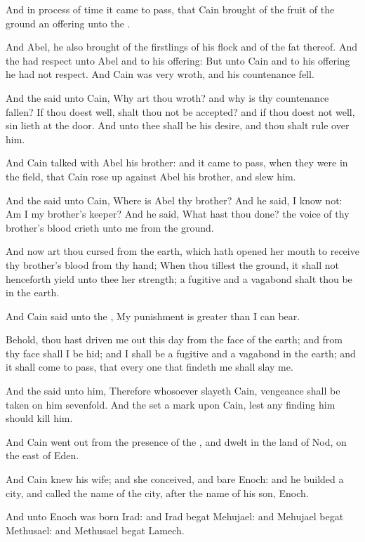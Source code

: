 \Verse And in process of time it came to pass, that Cain brought of the fruit of the ground an offering unto the \LORD.

\Verse And Abel, he also brought of the firstlings of his flock and of the fat thereof. And the \LORD had respect unto Abel and to his offering: \Verse But unto Cain and to his offering he had not respect.  And Cain was very wroth, and his countenance fell.

\Verse And the \LORD said unto Cain, Why art thou wroth? and why is thy countenance fallen?  \Verse If thou doest well, shalt thou not be accepted? and if thou doest not well, sin lieth at the door. And unto thee shall be his desire, and thou shalt rule over him.

\Verse And Cain talked with Abel his brother: and it came to pass, when they were in the field, that Cain rose up against Abel his brother, and slew him.

\Verse And the \LORD said unto Cain, Where is Abel thy brother? And he said, I know not: Am I my brother's keeper?  \Verse And he said, What hast thou done? the voice of thy brother's blood crieth unto me from the ground.

\Verse And now art thou cursed from the earth, which hath opened her mouth to receive thy brother's blood from thy hand; \Verse When thou tillest the ground, it shall not henceforth yield unto thee her strength; a fugitive and a vagabond shalt thou be in the earth.

\Verse And Cain said unto the \LORD, My punishment is greater than I can bear.

\Verse Behold, thou hast driven me out this day from the face of the earth; and from thy face shall I be hid; and I shall be a fugitive and a vagabond in the earth; and it shall come to pass, that every one that findeth me shall slay me.

\Verse And the \LORD said unto him, Therefore whosoever slayeth Cain, vengeance shall be taken on him sevenfold. And the \LORD set a mark upon Cain, lest any finding him should kill him.

\Verse And Cain went out from the presence of the \LORD, and dwelt in the land of Nod, on the east of Eden.

\Verse And Cain knew his wife; and she conceived, and bare Enoch: and he builded a city, and called the name of the city, after the name of his son, Enoch.

\Verse And unto Enoch was born Irad: and Irad begat Mehujael: and Mehujael begat Methusael: and Methusael begat Lamech.

